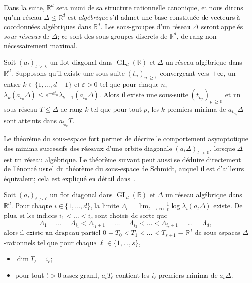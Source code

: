 \documentclass[AHL,Unicode,longabstracts,francais,published]{cedram}
\DeclareMathOperator{\GL}{GL}
\newcommand{\se}[2]{\{#1,\dots,#2\}}
\newcommand{\R}{\mathbb{R}}
\newcommand{\eps}{\varepsilon}
\begin{document}
Dans la suite, $\R^d$ sera muni de sa structure rationnelle canonique, et nous dirons qu'un réseau $\Delta\leq\R^d$ est \emph{algébrique} s'il admet une base constituée de vecteurs à coordonnées algébriques dans $\R^d$. Les sous-groupes d'un réseau $\Delta$ seront appelés \emph{sous-réseaux} de $\Delta$; ce sont des sous-groupes discrets de $\R^d$, de rang non nécessairement maximal.

\begin{theo}
Soit $(a_t)_{t\,>\,0}$ un flot diagonal dans $\GL_d(\R)$ et $\Delta$ un réseau algébrique dans $\R^d$. Supposons qu'il existe une sous-suite $(t_n)_{n\,\geq\,0}$ convergeant vers $+\infty$, un entier $k\in\se{1}{d-1}$ et $\eps>0$ tel que pour chaque $n$, $\lambda_k(a_{t_n}\Delta)\leq e^{-\eps t_n}\lambda_{k+1}(a_{t_n}\Delta)$. Alors il existe une sous-suite $(t_{n_p})_{p\,\geq\,0}$ et un sous-réseau $T\leq\Delta$ de rang $k$ tel que pour tout $p$, les $k$ premiers minima de $a_{t_{n_p}}\Delta$ sont atteints dans $a_{t_{n_p}}T$.
\end{theo}

Le théorème du sous-espace fort permet de décrire le comportement asymptotique des minima successifs des réseaux d'une orbite diagonale $(a_t\Delta)_{t\,>\,0}$, lorsque $\Delta$ est un réseau algébrique. Le théorème suivant peut aussi se déduire directement de l'énoncé usuel du théorème du sous-espace de Schmidt, auquel il est d'ailleurs équivalent; cela est expliqué en détail dans~\cite{breuillardsaxce}.

\begin{theo}\label{drapeau}
Soit $(a_t)_{t\,>\,0}$ un flot diagonal dans $\GL_d(\R)$ et $\Delta$ un réseau algébrique dans $\R^d$. Pour chaque $i\in\se{1}{d}$, la limite $\Lambda_i = \lim_{t\,\to\,\infty} \frac{1}{t}\log\lambda_i(a_t\Delta)$ existe. De plus, si les indices $i_1<\dots<i_s$ sont choisis de sorte que
\[
\Lambda_1=\dots=\Lambda_{i_1}<\Lambda_{i_1+1}=\dots=\Lambda_{i_2}<\dots<\Lambda_{i_s+1}=\dots=\Lambda_d,
\]
alors il existe un drapeau partiel $0=T_0<T_1<\dots<T_{s+1}=\R^d$ de sous-espaces $\Delta$-rationnels tel que pour chaque $\ell\in\se{1}{s}$,
\begin{itemize}
\item $\dim T_\ell = i_\ell$;
\item pour tout $t>0$ assez grand, $a_tT_\ell$ contient les $i_\ell$ premiers minima de $a_t\Delta$.
\end{itemize}
\end{theo}
\end{document}
